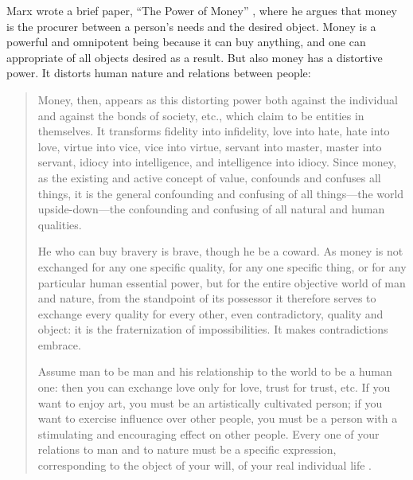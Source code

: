 \documentclass[10pt, letterpaper]{article}
\begin{document}
\begin{spacing}{1.8}
Marx wrote a brief paper, ``The Power of Money'' \citep{marx1844-powerOfMoney}, where he argues that money is the procurer between a person's needs and the desired object. Money is a powerful and omnipotent being because it can buy anything, and one can appropriate of all objects desired as a result.
But %
also %
money has a distortive power. It distorts human nature and relations between people:
\begin{quote}
Money, then, appears as this distorting power both against the individual and against the bonds of society, etc., which claim to be entities in themselves. It transforms fidelity into infidelity, love into hate, hate into love, virtue into vice, vice into virtue, servant into master, master into servant, idiocy into intelligence, and intelligence into idiocy. Since money, as the existing and active concept of value, confounds and confuses all things, it is the general confounding and confusing of all things---the world upside-down---the confounding and confusing of all natural and human qualities.

He who can buy bravery is brave, though he be a coward. As money is not exchanged for any one specific quality, for any one specific thing, or for any particular human essential power, but for the entire objective world of man and nature, from the standpoint of its possessor it therefore serves to exchange every quality for every other, even contradictory, quality and object: it is the fraternization of impossibilities. It makes contradictions embrace.

Assume man to be man and his relationship to the world to be a human one: then you can exchange love only for love, trust for trust, etc. If you want to enjoy art, you must be an artistically cultivated person; if you want to exercise influence over other people, you must be a person with a stimulating and encouraging effect on other people. Every one of your relations to man and to nature must be a specific expression, corresponding to the object of your will, of your real individual life \citep[cited in]{marx1844-powerOfMoney}.
\end{quote}


\end{spacing}
\end{document}
